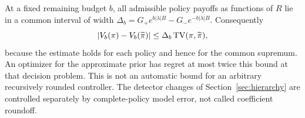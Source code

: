 At a fixed remaining budget $b$, all admissible policy payoffs as functions of $R$ lie in a common interval of width
$\Delta_b=G_+e^{b|\lambda|B}-G_-e^{-b|\lambda|B}$. Consequently
\[
 |V_b(\pi)-V_b(\widetilde\pi)|\le\Delta_b\operatorname{TV}(\pi,\widetilde\pi),
\]
because the estimate holds for each policy and hence for the common supremum. An optimizer for the approximate prior has regret at most twice this bound at that decision problem. This is not an automatic bound for an arbitrary recursively rounded controller. The detector changes of Section~\ref{sec:hierarchy} are controlled separately by complete-policy model error, not called coefficient roundoff.
